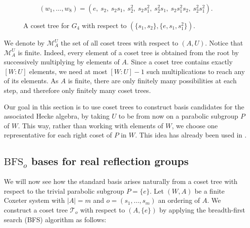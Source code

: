 \documentclass[11pt, reqno]{amsart}
\newcommand{\cM}{\mathcal{M}}
\newcommand{\BFS}{\mathrm{BFS}}
\numberwithin{equation}{section}
\theoremstyle{remark}
\begin{document}
	\begin{figure}[H]
		\centering
		\[
		(w_1,\ldots,w_8)
		=
		(e,\ s_2,\ s_2s_1,\ s_2^2,\ s_2s_1^2,\ s_2^2s_1,\ 
		s_2s_1^2s_2,\ s_2^2s_1^2).
		\]
		\caption{A coset tree for $G_4$ with respect to $(\{s_1,s_2\}, \{e,s_1,s_1^2\})$.}
		\label{fig:one}
	\end{figure}
	
	
	
	We denote by $\cM_A^U$ the set of all coset trees with respect to $(A,U)$. Notice that $\cM_A^U$ is finite. Indeed, every element of a coset tree is obtained from the root by successively multiplying by elements of $A$. Since a coset tree contains exactly $[W:U]$ elements, we need at most $[W:U]-1$ such multiplications to reach any of its elements. As $A$ is finite, there are only finitely many possibilities at each step, and therefore only finitely many coset trees. 
		
	Our goal in this section is to use coset trees to construct basis candidates for the associated Hecke algebra, by taking $U$ to be from now on a parabolic subgroup $P$ of $W$. 
	This way, rather than working with elements of $W$, we choose one representative for each right coset of $P$ in $W$. This idea has already been used in \cite{Ch17, ChPf1, ChPf}.
	
	
	\subsection{$\BFS_o$ bases for real reflection groups}
	We will now see  how the standard basis arises naturally from a coset tree with respect to the trivial parabolic subgroup $P=\{e\}$.
	Let $(W,A)$ be a finite Coxeter system with $|A|=m$ and
	$
	o=(s_1,\ldots,s_m)$
	an ordering of $A$. We construct a coset tree $\mathcal{T}_o$ with respect to $(A,\{e\})$ by applying the breadth-first search (BFS) algorithm as follows:
	
\end{document}
